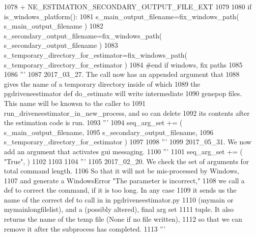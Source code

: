 \begin{DoxyCode}
1078                 + NE\_ESTIMATION\_SECONDARY\_OUTPUT\_FILE\_EXT
1079 
1080         \textcolor{keywordflow}{if} is\_windows\_platform():
1081             s\_main\_output\_filename=fix\_windows\_path( s\_main\_output\_filename )
1082             s\_secondary\_output\_filename=fix\_windows\_path( s\_secondary\_output\_filename )
1083             s\_temporary\_directory\_for\_estimator=fix\_windows\_path( s\_temporary\_directory\_for\_estimator )
1084         \textcolor{comment}{#end if windows, fix paths}
1085 
1086         \textcolor{stringliteral}{'''}
1087 \textcolor{stringliteral}{        2017\_03\_27.  The call now has an appended argument that}
1088 \textcolor{stringliteral}{        gives the name of a temporary directory inside of which}
1089 \textcolor{stringliteral}{        the pgdriveneestimator def do\_estimate will write intermediate}
1090 \textcolor{stringliteral}{        genepop files.  This name will be knowsn to the caller to}
1091 \textcolor{stringliteral}{        run\_driveneestimator\_in\_new\_process, and so can delete}
1092 \textcolor{stringliteral}{        its contents after the estimation code is run.}
1093 \textcolor{stringliteral}{        '''}
1094         seq\_arg\_set += ( s\_main\_output\_filename,
1095                                 s\_secondary\_output\_filename, 
1096                                 s\_temporary\_directory\_for\_estimator )
1097 
1098         \textcolor{stringliteral}{'''}
1099 \textcolor{stringliteral}{        2017\_05\_31.  We now add an argument that activates gui messaging.}
1100 \textcolor{stringliteral}{        '''}
1101         seq\_arg\_set += ( \textcolor{stringliteral}{"True"}, )
1102 
1103 
1104         \textcolor{stringliteral}{'''}
1105 \textcolor{stringliteral}{        2017\_02\_20.  We check the set of arguments for total command length.}
1106 \textcolor{stringliteral}{        So that it will not be mis-processed by Windows,}
1107 \textcolor{stringliteral}{        and generate a WindowsError "The parameter is incorrect,"  }
1108 \textcolor{stringliteral}{        we call a def to correct the command, if it is too long.  In any case}
1109 \textcolor{stringliteral}{        it sends us the name of the correct def to call in in pgdriveneestimator.py }
1110 \textcolor{stringliteral}{        (mymain or mymainlongfilelist), and a (possibly altered), final arg set}
1111 \textcolor{stringliteral}{        tuple.  It also returns the name of the temp file (None if no file written),}
1112 \textcolor{stringliteral}{        so that we can remove it after the subprocess has completed.}
1113 \textcolor{stringliteral}{        '''}

\end{DoxyCode}
